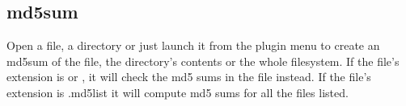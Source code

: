 \subsection{md5sum}
Open a file, a directory or just launch it from the plugin menu to create
an md5sum of the file, the directory's contents or the whole filesystem.
 If the file's extension is  or , it will check 
 the md5 sums in the file instead. If the file's extension is .md5list it 
 will compute md5 sums for all the files listed.